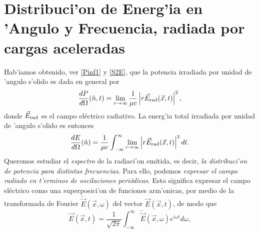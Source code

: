 \section{Distribuci'on de Energ'ia en 'Angulo y Frecuencia, radiada
por cargas aceleradas}

Hab'iamos obtenido, ver \eqref{Pinf1} y \eqref{S2E}, que la potencia irradiada por unidad de 'angulo s'olido es dada en general por
\begin{equation}\label{dp1}
\frac{dP}{d\Omega}(\hat{n},t)=\lim_{r\to\infty}\frac{1}{\mu c}\left|r\vec{E}_{\rm{rad}}(\vec{x},t)\right|^2 , %
\end{equation}
donde $\vec{E}_{\rm{rad}}$ es el campo eléctrico radiativo.
%
La energ'ia total irradiada por unidad de 'angulo s'olido es entonces
\begin{equation}
\frac{dE}{d\Omega}(\hat{n}) =\frac{1}{\mu c}\int_{-\infty}^{\infty}\lim_{r\to\infty}\left|r\vec{E}_{\rm{rad}}(\vec{x},t)\right|^2 dt .
\end{equation}
Queremos estudiar el \textit{espectro} de la radiaci'on emitida, es decir, \textit{la distribuci'on de potencia para distintas frecuencias}. Para ello, podemos \textit{expresar el campo radiado en t'erminos de oscilaciones periódicas}. Esto significa expresar el campo eléctrico como una superposici'on de funciones arm'onicas, por medio de la transformada de Fourier $\tilde{\vec{E}}(\vec{x},\omega)$ del vector $\vec{E}(\vec{x},t)$, de modo que
\begin{equation}
 \vec{E}(\vec{x},t)=\frac{1}{\sqrt{2\pi}}\int_{-\infty}^{\infty}\tilde{\vec{E}}
(\vec{x},\omega) e^{i\omega t}d\omega ,
\end{equation}
